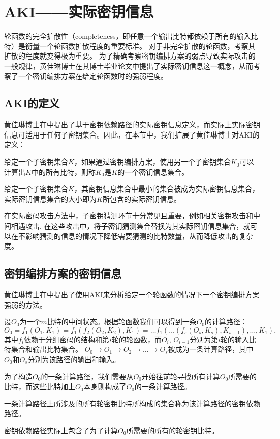 
\chapter{AKI——实际密钥信息}
\label{chap:AKI}
轮函数的完全扩散性（completeness，即任意一个输出比特都依赖于所有的输入比特）是衡量一个轮函数扩散程度的重要标准。
对于非完全扩散的轮函数，考察其扩散的程度就变得极为重要。
为了精确考察密钥编排方案的弱点导致实际攻击的一般规律，黄佳琳博士在其博士毕业论文中提出了实际密钥信息这一概念，从而考察了一个密钥编排方案在给定轮函数时的强弱程度。
\section{AKI的定义}
黄佳琳博士在中提出了基于密钥依赖路径的实际密钥信息定义，而实际上实际密钥信息可适用于任何子密钥集合。因此，在本节中，我们扩展了黄佳琳博士对AKI的定义：
\begin{defn}[密钥信息集合]
    给定一个子密钥集合$K$，如果通过密钥编排方案，使用另一个子密钥集合$K_0$可以计算出$K$中的所有比特，则称$K_0$是$K$的一个密钥信息集合。
\end{defn}
\begin{defn}
    给定一个子密钥集合$K$，其密钥信息集合中最小的集合被成为实际密钥信息集合，实际密钥信息集合的大小即为$K$所包含的实际密钥信息。
\end{defn}
在实际密码攻击方法中，子密钥猜测环节十分常见且重要，例如相关密钥攻击和中间相遇攻击.
在这些攻击中，将子密钥猜测集合替换为其实际密钥信息集合，就可以在不影响猜测的信息的情况下降低需要猜测的比特数量，从而降低攻击的复杂度。
\section{密钥编排方案的密钥信息}
黄佳琳博士在中提出了使用AKI来分析给定一个轮函数的情况下一个密钥编排方案强弱的方法。
\begin{defn}[计算路径]
    设$O_0$为一个$m$比特的中间状态。根据轮函数我们可以得到一条$O_0$的计算路径：
    $$O_0=f_1(O_1,K_1)=f_1(f_2(O_2,K_2),K_1)=\dots f_1(\dots(f_s(O_s,K_s),K_{s-1}),\dots,K_1),$$
    其中$f_i$依赖于分组密码的结构和第$i$轮的轮函数，而$O_i$, $O_{i-1}$分别为第$i$轮的输入比特集合和输出比特集合。
    $O_0\rightarrow O_1\rightarrow O_2\rightarrow\dots\rightarrow O_s$被成为一条计算路径，其中$O_0$和$O_s$分别为该路径的输出和输入。
\end{defn}
为了构造$O_0$的一条计算路径，我们需要从$O_0$开始往前轮寻找所有计算$O_0$所需要的比特，而这些比特加上$O_0$本身则构成了$O_0$的一条计算路径。
\begin{defn}[密钥依赖路径]
    一条计算路径上所涉及的所有轮密钥比特所构成的集合称为该计算路径的密钥依赖路径。
\end{defn}
密钥依赖路径实际上包含了为了计算$O_0$所需要的所有的轮密钥比特。

